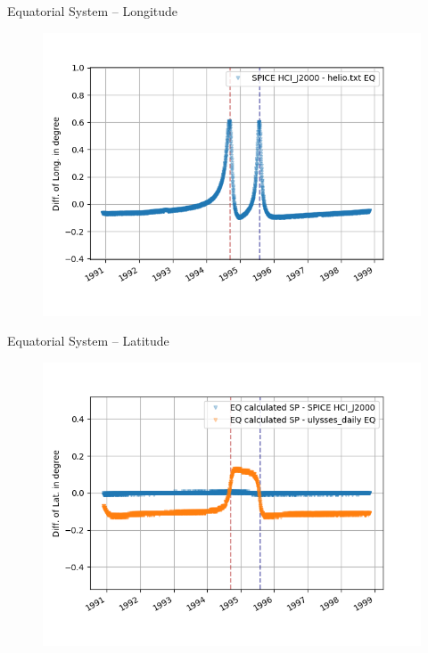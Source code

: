 \documentclass{beamer}
\begin{document}
\begin{frame}{Equatorial System -- Longitude}
\begin{figure}									
	\includegraphics[width=1\textwidth]{Pics/EQ_LONG.png}
\end{figure}
\end{frame}

\begin{frame}{Equatorial System -- Latitude}
\begin{figure}									
	\includegraphics[width=1\textwidth]{Pics/EQ_LAT_CALC.png}
\end{figure}
\end{frame}
\end{document}
